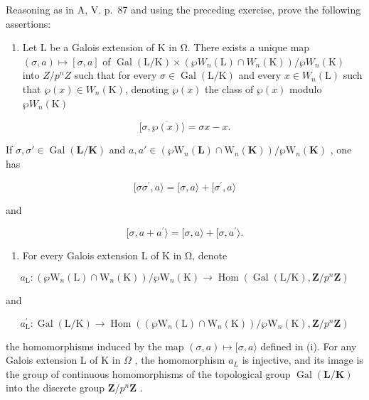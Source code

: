 Reasoning as in A, V. p.~87 and using the preceding exercise, prove the following assertions:

\begin{enumerate}
\def\labelenumi{(\roman{enumi})}
\tightlist
\item
  Let L be a Galois extension of K in Ω. There exists a unique map \((\sigma, a) \mapsto [\sigma, a]\) of \(\operatorname{Gal}(\mathrm{L}/\mathrm{K}) \times (\wp W_{n}(\mathrm{L}) \cap W_{n}(\mathrm{K}))/\wp W_{n}(\mathrm{K})\) into \(Z/p^{n}Z\) such that for every \(\sigma \in \operatorname{Gal}(\mathrm{L}/\mathrm{K})\) and every \(x \in W_{n}(\mathrm{L})\) such that \(\wp(x) \in W_{n}(\mathrm{K})\), denoting \(\wp(x)\) the class of \(\wp(x)\) modulo \(\wp W_{n}(\mathrm{K})\)
\end{enumerate}

\[
[ \sigma , \overline {{\wp (x)}} \rangle = \sigma x - x.
\]

If \(\sigma, \sigma' \in \operatorname{Gal}(\mathbf{L} / \mathbf{K})\) and \(a, a' \in (\wp \mathrm{W}_n(\mathbf{L}) \cap \mathrm{W}_n(\mathbf{K})) / \wp \mathrm{W}_n(\mathbf{K})\) , one has

\[
[ \sigma \sigma^ {\prime}, a \rangle = [ \sigma , a \rangle + [ \sigma^ {\prime}, a \rangle
\]

and

\[
[ \sigma , a + a ^ {\prime} \rangle = [ \sigma , a \rangle + [ \sigma , a ^ {\prime} \rangle .
\]

\begin{enumerate}
\def\labelenumi{(\roman{enumi})}
\setcounter{enumi}{1}
\tightlist
\item
  For every Galois extension L of K in Ω, denote
\end{enumerate}

\[
a _ {\mathrm{L}}: (\wp \mathrm{W} _ {n} (\mathrm{L}) \cap \mathrm{W} _ {n} (\mathrm{K})) / \wp \mathrm{W} _ {n} (\mathrm{K}) \rightarrow \operatorname{Hom} (\operatorname{Gal} (\mathrm{L} / \mathrm{K}), \mathbf {Z} / p ^ {n} \mathbf {Z})
\]

and

\[
a _ {\mathrm{L}} ^ {\prime}: \operatorname{Gal} (\mathrm{L} / \mathrm{K}) \rightarrow \operatorname{Hom} ((\wp \mathrm{W} _ {n} (\mathrm{L}) \cap \mathrm{W} _ {n} (\mathrm{K})) / \wp \mathrm{W} _ {n} (\mathrm{K}), \mathbf {Z} / p ^ {n} \mathbf {Z})
\]

the homomorphisms induced by the map \((\sigma, a) \mapsto [\sigma, a \rangle\) defined in (i). For any Galois extension L of K in \(\Omega\) , the homomorphism \(a_{L}\) is injective, and its image is the group of continuous homomorphisms of the topological group \(\operatorname{Gal}(\mathbf{L}/\mathbf{K})\) into the discrete group \(\mathbf{Z}/p^{n}\mathbf{Z}\) .

